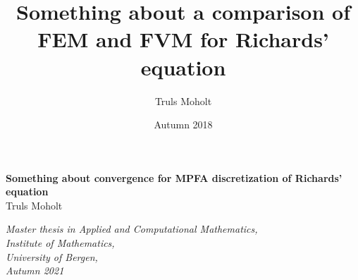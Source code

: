 \documentclass[12pt,oneside]{book}
\author{Truls Moholt}
\title{\vspace{-3.0cm}Something about a comparison of FEM and FVM for Richards' equation}
\date{Autumn 2018}
\numberwithin{equation}{chapter}
\theoremstyle{plain}
\begin{document}
\titlepage
\begin{center}
{\bf \LARGE Something about convergence for MPFA discretization of Richards' equation}\\
\vspace{10\in}
\vspace{150\in}
{\large Truls Moholt\\ \vspace{30\in}}

\vspace*{\fill}
\it{Master thesis in Applied and Computational Mathematics, \\Institute of Mathematics, \\University of Bergen, \\Autumn 2021}
\end{center}
\tableofcontents
\newpage
%













\end{document}
